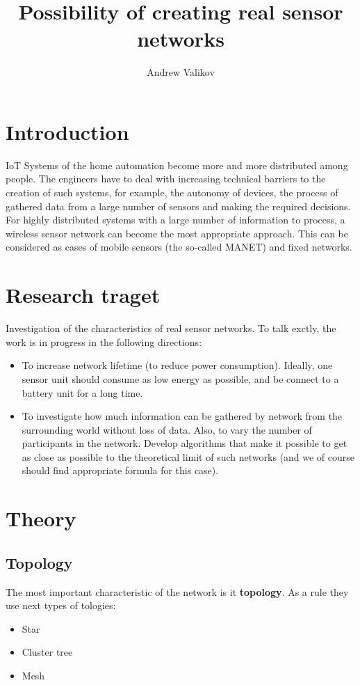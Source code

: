 \documentclass[12pt]{article}
\begin{document}
\title{Possibility of creating real sensor networks}
\author{Andrew Valikov}
\date{}
\maketitle

\section{Introduction}
IoT Systems of the home automation become more and more distributed among people. The engineers have to deal with increasing technical barriers to the creation of such systems, for example, the autonomy of devices, the process of gathered data from a large number of sensors and making the required decisions. For highly distributed systems with a large number of information to process, a wireless sensor network can become the most appropriate approach. This can be considered as cases of mobile sensors (the so-called MANET) and fixed networks.

\section{Research traget}
Investigation of the characteristics of real sensor networks. To talk exctly, the work is in progress in the following directions:

\begin{itemize}
\item To increase network lifetime (to reduce power consumption). Ideally, one sensor unit should consume as low energy as possible, and be connect to a battery unit for a long time.

\item To investigate how much information can be gathered by network from the surrounding world without loss of data. Also, to vary the number of participants in the network. Develop algorithms that make it possible to get as close as possible to the theoretical limit of such networks (and we of course should find appropriate formula for this case).
\end{itemize}


\section{Theory}

\subsection{Topology}
The most important characteristic of the network is it \textbf{topology}. As a rule they use next types of tologies:
\begin{itemize}
	\item Star
	\item Cluster tree
	\item Mesh
\end{itemize}
\end{document}
